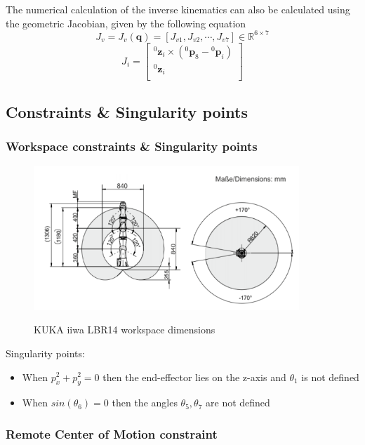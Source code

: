 The numerical calculation of the inverse kinematics can also be calculated using the geometric Jacobian, given by the following equation
\[
J_v = J_v( \mathbf{q} ) = [ J_{v1}, J_{v2}, \cdots, J_{v7} ] \in \mathbb{R}^{6 \times 7}
\]
\begin{equation}
J_i = \begin{bmatrix}
{}^0\mathbf{z}_i \times ({}^0\mathbf{p}_8 - {}^0\mathbf{p}_i) \\
{}^0\mathbf{z}_i \\
\end{bmatrix}
\end{equation}


\subsection{Constraints \& Singularity points}

\subsubsection{Workspace constraints \& Singularity points}

\begin{center}
\begin{figure}[!htb]
\centering
\includegraphics[width=10cm]{images/iiwa-workspace.png}\\
\caption{KUKA iiwa LBR14 workspace dimensions}
\end{figure}
\end{center}

Singularity points:
\begin{itemize}
	\item When $p_x^2 + p_y^2 = 0$ then the end-effector lies on the z-axis and $θ_1$ is not defined
	\item When $sin\left( θ_6 \right) = 0$ then the angles $θ_5, θ_7$ are not defined
\end{itemize}

\subsubsection{Remote Center of Motion constraint}
\label{rcm-subsubsection}

